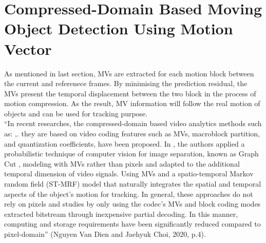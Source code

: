 \section{Compressed-Domain Based Moving Object Detection Using Motion Vector}




 As mentioned in last section, MVs are extracted for each motion block between the current and referenece frames. By minimising the prediction residual, the MVs present the temporal displacement between the two block in the process of motion compression. As the result, MV information will follow the real motion of objects and can be used for tracking purpose.\\
“In recent researches, the compressed-domain based video analytics methods such as: \cite{bombardelli2018efficient},\cite{khatoonabadi2012video}. they are based on video coding features such as MVs, macroblock partition, and quantization coefficients, have been proposed. In \cite{bombardelli2018efficient}, the authors applied a probabilistic technique of computer vision for image separation, known as Graph Cut \cite{boykov2001fast}, modeling with MVs rather than pixels and adapted to the additional temporal dimension of video signals. Using MVs and a spatio-temporal Markov random field (ST-MRF) model that naturally integrates the spatial and temporal aspects of the object’s motion for tracking. In general, these approaches do not rely on pixels and studies by only using the codec’s MVs and block coding modes extracted bitstream through inexpensive partial decoding. In this manner, computing and storage requirements have been significantly reduced compared to pixel-domain” (Nguyen Van Dien and Jaehyuk Choi, 2020, p.4).\\

